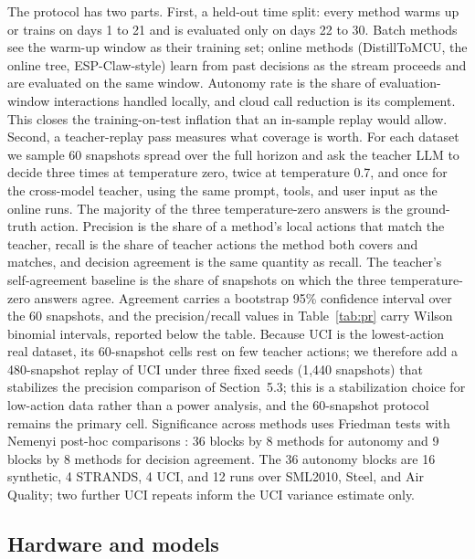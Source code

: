 \documentclass[review]{elsarticle}
\begin{document}
The protocol has two parts. First, a held-out time split: every method warms
up or trains on days 1 to 21 and is evaluated only on days 22 to 30. Batch
methods see the warm-up window as their training set; online methods
(DistillToMCU, the online tree, ESP-Claw-style) learn from past decisions as
the stream proceeds and are evaluated on the same window. Autonomy rate is
the share of evaluation-window interactions handled locally, and cloud call
reduction is its complement. This closes the training-on-test inflation that
an in-sample replay would allow. Second, a teacher-replay pass measures what
coverage is worth. For each dataset we sample 60 snapshots spread over the
full horizon and ask the teacher LLM to decide three times at temperature
zero, twice at temperature 0.7, and once for the cross-model teacher, using
the same prompt, tools, and user input as the online runs. The majority of
the three temperature-zero answers is the ground-truth action. Precision is
the share of a method's local actions that match the teacher, recall is the
share of teacher actions the method both covers and matches, and decision
agreement is the same quantity as recall. The teacher's self-agreement
baseline is the share of snapshots on which the three temperature-zero answers
agree. Agreement carries a bootstrap 95\% confidence interval over the 60
snapshots, and the precision/recall values in Table~\ref{tab:pr} carry Wilson
binomial intervals, reported below the table. Because UCI is the
lowest-action real dataset, its 60-snapshot cells rest on few teacher
actions; we therefore add a 480-snapshot replay of UCI under three fixed
seeds (1,440 snapshots) that stabilizes the precision comparison of
Section~5.3; this is a stabilization choice for low-action data rather than
a power analysis, and the 60-snapshot protocol remains the primary cell.
Significance across methods uses Friedman tests with Nemenyi
post-hoc comparisons \cite{30}: 36 blocks by 8 methods for autonomy and 9
blocks by 8 methods for decision agreement. The 36 autonomy blocks are 16
synthetic, 4 STRANDS, 4 UCI, and 12 runs over SML2010, Steel, and Air
Quality; two further UCI repeats inform the UCI variance estimate only.

\subsection{Hardware and models}
\end{document}
